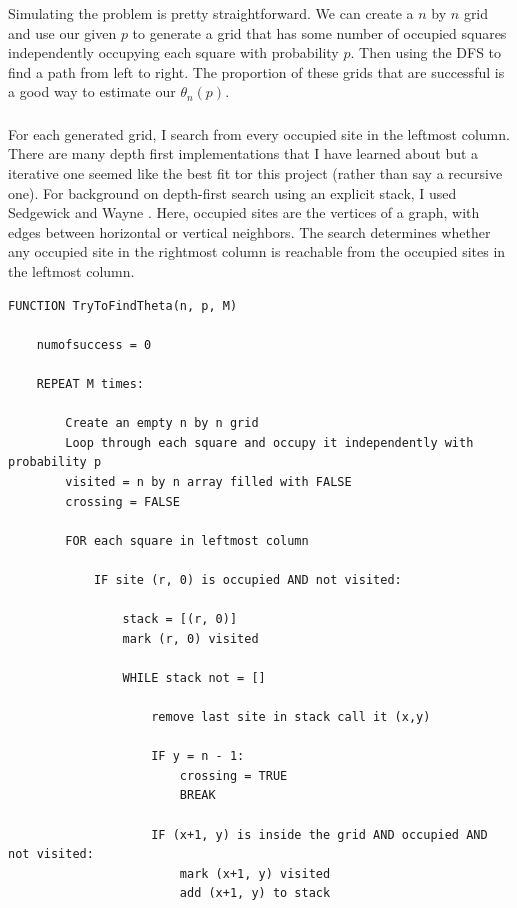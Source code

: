\documentclass[11pt]{scrartcl}
\begin{document}
		\begin{soln}
			
			Simulating the problem is pretty straightforward. 
            We can create a $n$ by $n$ grid and use our given $p$ to generate
             a grid that has some number of occupied squares independently occupying each square
              with probability $p$. Then using the DFS to find a path from left 
              to right. The proportion of these grids that are successful is a good way to estimate
               our $\theta_n(p)$.
			\subsubsection*{}
			
			For each generated grid, I search from every occupied site in the
			leftmost column. There are many depth first implementations that I have learned about but a iterative one seemed like the best fit tor this project (rather than say a recursive one).
			For background on depth-first search using an explicit stack,
			I used Sedgewick and Wayne \cite{sedgewick-wayne-dfs}.
			Here, occupied sites are the vertices of a graph, with edges
			between horizontal or vertical neighbors. The search determines
			whether any occupied site in the rightmost column is reachable
			from the occupied sites in the leftmost column.

\begin{lstlisting}[style=pseudoStyle]
FUNCTION TryToFindTheta(n, p, M)

    numofsuccess = 0

    REPEAT M times:

        Create an empty n by n grid
        Loop through each square and occupy it independently with probability p
        visited = n by n array filled with FALSE
        crossing = FALSE

        FOR each square in leftmost column

            IF site (r, 0) is occupied AND not visited:

                stack = [(r, 0)]
                mark (r, 0) visited

                WHILE stack not = []

                    remove last site in stack call it (x,y)

                    IF y = n - 1:
                        crossing = TRUE
                        BREAK

                    IF (x+1, y) is inside the grid AND occupied AND not visited:
                        mark (x+1, y) visited
                        add (x+1, y) to stack


\end{lstlisting}
\end{soln}
\end{document}
